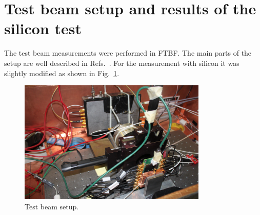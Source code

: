 \documentclass[12pt]{article}
\begin{document}
{%



\section{Test beam setup and results of the silicon test }
\label{sec:tbeam}

The test beam measurements were performed in FTBF. The main parts of the setup are well described in Refs.~\cite{Anderson:2015gha, MCPFastCaloNIMA, Ronzhin2015288,
Ronzhin201552}. For the measurement with silicon it was slightly modified as shown in Fig.~\ref{fig:SiliconPadTBeam}.

\begin{figure}[htbp] 
\centering
\includegraphics[width=0.8\textwidth]{plots/SiliconPadTestBeam.png} 
\caption{Test beam setup.} 
\label{fig:SiliconPadTBeam} 
\end{figure} 

}
\end{document}

